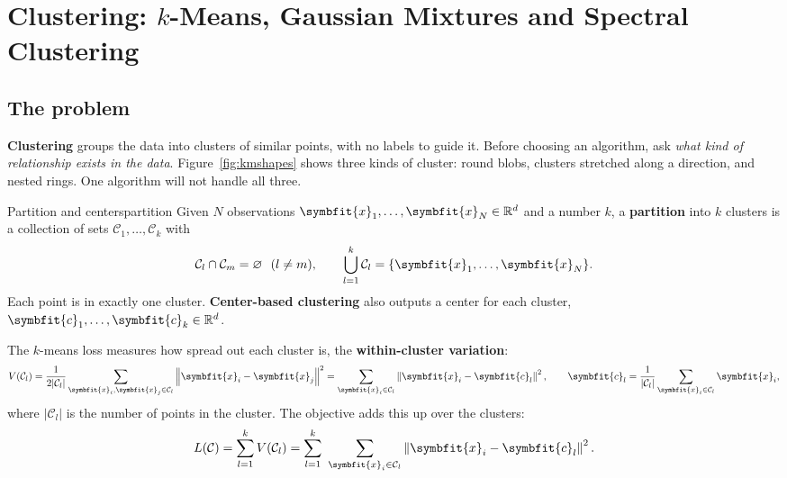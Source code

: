 \documentclass[11pt]{article}
\newcommand{\bm}[1]{\symbfit{#1}}
\newcommand{\R}{\mathbb{R}}
\newcommand{\vx}{\bm{x}}
\newcommand{\norm}[1]{\left\lVert #1\right\rVert}
\begin{document}
\clearpage
\section{Clustering: $k$-Means, Gaussian Mixtures and Spectral Clustering}\label{sec:kmeans}

\subsection{The problem}

\textbf{Clustering} groups the data into clusters of similar points, with no labels to guide it. Before choosing an algorithm, ask \emph{what kind of relationship exists in the data}. Figure~\ref{fig:kmshapes} shows three kinds of cluster: round blobs, clusters stretched along a direction, and nested rings. One algorithm will not handle all three.

\begin{definition}{Partition and centers}{partition}
Given $N$ observations $\vx_1,\dots,\vx_N\in\R^d$ and a number $k$, a \textbf{partition} into $k$ clusters is a collection of sets $\mathcal C_1,\dots,\mathcal C_k$ with
\[
\mathcal C_l\cap\mathcal C_m=\varnothing\ \ (l\ne m),\qquad \bigcup_{l=1}^k\mathcal C_l=\{\vx_1,\dots,\vx_N\}.
\]
Each point is in exactly one cluster. \textbf{Center-based clustering} also outputs a center for each cluster, $\bm c_1,\dots,\bm c_k\in\R^d$.
\end{definition}

The $k$-means loss measures how spread out each cluster is, the \textbf{within-cluster variation}:
\[
V(\mathcal C_l)=\frac1{2|\mathcal C_l|}\sum_{\vx_i,\vx_j\in\mathcal C_l}\norm{\vx_i-\vx_j}^2
=\sum_{\vx_i\in\mathcal C_l}\norm{\vx_i-\bm c_l}^2,
\qquad \bm c_l=\frac1{|\mathcal C_l|}\sum_{\vx_i\in\mathcal C_l}\vx_i ,
\]
where $|\mathcal C_l|$ is the number of points in the cluster. The objective adds this up over the clusters:
\[
L(\mathcal C)=\sum_{l=1}^kV(\mathcal C_l)=\sum_{l=1}^k\ \sum_{\vx_i\in\mathcal C_l}\norm{\vx_i-\bm c_l}^2 .
\]
\end{document}
